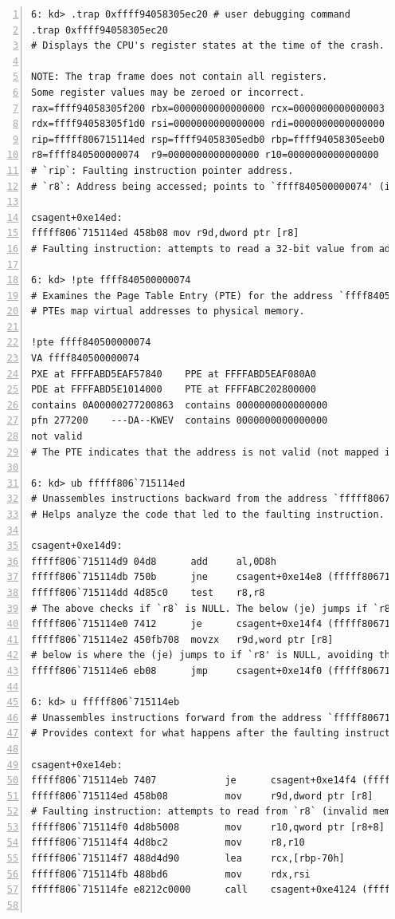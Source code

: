 \begin{lstlisting}[caption=Debugging csagent.sys Module (\# comments), numbers=left]
6: kd> .trap 0xffff94058305ec20 # user debugging command
.trap 0xffff94058305ec20
# Displays the CPU's register states at the time of the crash.

NOTE: The trap frame does not contain all registers.
Some register values may be zeroed or incorrect.
rax=ffff94058305f200 rbx=0000000000000000 rcx=0000000000000003
rdx=ffff94058305f1d0 rsi=0000000000000000 rdi=0000000000000000
rip=fffff806715114ed rsp=ffff94058305edb0 rbp=ffff94058305eeb0
r8=ffff840500000074  r9=0000000000000000 r10=0000000000000000
# `rip`: Faulting instruction pointer address.
# `r8`: Address being accessed; points to `ffff840500000074' (invalid memory).

csagent+0xe14ed:
fffff806`715114ed 458b08 mov r9d,dword ptr [r8]
# Faulting instruction: attempts to read a 32-bit value from address stored in `r8`.

6: kd> !pte ffff840500000074
# Examines the Page Table Entry (PTE) for the address `ffff840500000074.'
# PTEs map virtual addresses to physical memory.

!pte ffff840500000074
VA ffff840500000074
PXE at FFFFABD5EAF57840    PPE at FFFFABD5EAF080A0
PDE at FFFFABD5E1014000    PTE at FFFFABC202800000
contains 0A00000277200863  contains 0000000000000000
pfn 277200    ---DA--KWEV  contains 0000000000000000
not valid
# The PTE indicates that the address is not valid (not mapped in memory).

6: kd> ub fffff806`715114ed
# Unassembles instructions backward from the address `fffff806715114ed`.
# Helps analyze the code that led to the faulting instruction.

csagent+0xe14d9:
fffff806`715114d9 04d8      add     al,0D8h
fffff806`715114db 750b      jne     csagent+0xe14e8 (fffff806715114e8)
fffff806`715114dd 4d85c0    test    r8,r8 
# The above checks if `r8` is NULL. The below (je) jumps if `r8' is NULL.
fffff806`715114e0 7412      je      csagent+0xe14f4 (fffff806715114f4) 
fffff806`715114e2 450fb708  movzx   r9d,word ptr [r8]
# below is where the (je) jumps to if `r8' is NULL, avoiding the `r8' read above.
fffff806`715114e6 eb08      jmp     csagent+0xe14f0 (fffff806715114f0)

6: kd> u fffff806`715114eb
# Unassembles instructions forward from the address `fffff806715114eb`.
# Provides context for what happens after the faulting instruction.

csagent+0xe14eb:
fffff806`715114eb 7407            je      csagent+0xe14f4 (fffff806715114f4)
fffff806`715114ed 458b08          mov     r9d,dword ptr [r8]
# Faulting instruction: attempts to read from `r8` (invalid memory).
fffff806`715114f0 4d8b5008        mov     r10,qword ptr [r8+8]
fffff806`715114f4 4d8bc2          mov     r8,r10
fffff806`715114f7 488d4d90        lea     rcx,[rbp-70h]
fffff806`715114fb 488bd6          mov     rdx,rsi
fffff806`715114fe e8212c0000      call    csagent+0xe4124 (fffff80671514124)


\end{lstlisting}
